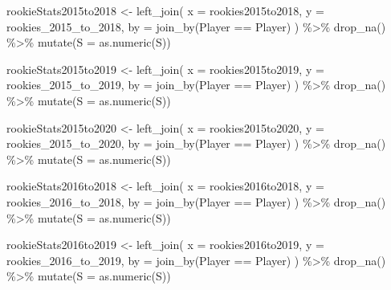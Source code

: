 \documentclass[
  letterpaper,
  DIV=11,
  numbers=noendperiod]{scrartcl}
\newenvironment{Shaded}{\begin{snugshade}}{\end{snugshade}}
\newcommand{\AttributeTok}[1]{\textcolor[rgb]{0.40,0.45,0.13}{#1}}
\newcommand{\FunctionTok}[1]{\textcolor[rgb]{0.28,0.35,0.67}{#1}}
\newcommand{\NormalTok}[1]{\textcolor[rgb]{0.00,0.23,0.31}{#1}}
\newcommand{\OtherTok}[1]{\textcolor[rgb]{0.00,0.23,0.31}{#1}}
\newcommand{\SpecialCharTok}[1]{\textcolor[rgb]{0.37,0.37,0.37}{#1}}
\begin{document}
\begin{Shaded}
\begin{Highlighting}[]
\NormalTok{rookieStats2015to2018 }\OtherTok{\textless{}{-}} \FunctionTok{left\_join}\NormalTok{(}
  \AttributeTok{x =}\NormalTok{ rookies2015to2018,}
  \AttributeTok{y =}\NormalTok{ rookies\_2015\_to\_2018,}
  \AttributeTok{by =} \FunctionTok{join\_by}\NormalTok{(Player }\SpecialCharTok{==}\NormalTok{ Player)}
\NormalTok{) }\SpecialCharTok{\%\textgreater{}\%}
  \FunctionTok{drop\_na}\NormalTok{() }\SpecialCharTok{\%\textgreater{}\%}
  \FunctionTok{mutate}\NormalTok{(}\AttributeTok{S =} \FunctionTok{as.numeric}\NormalTok{(S))}

\NormalTok{rookieStats2015to2019 }\OtherTok{\textless{}{-}} \FunctionTok{left\_join}\NormalTok{(}
  \AttributeTok{x =}\NormalTok{ rookies2015to2019,}
  \AttributeTok{y =}\NormalTok{ rookies\_2015\_to\_2019,}
  \AttributeTok{by =} \FunctionTok{join\_by}\NormalTok{(Player }\SpecialCharTok{==}\NormalTok{ Player)}
\NormalTok{) }\SpecialCharTok{\%\textgreater{}\%}
  \FunctionTok{drop\_na}\NormalTok{() }\SpecialCharTok{\%\textgreater{}\%}
  \FunctionTok{mutate}\NormalTok{(}\AttributeTok{S =} \FunctionTok{as.numeric}\NormalTok{(S))}

\NormalTok{rookieStats2015to2020 }\OtherTok{\textless{}{-}} \FunctionTok{left\_join}\NormalTok{(}
  \AttributeTok{x =}\NormalTok{ rookies2015to2020,}
  \AttributeTok{y =}\NormalTok{ rookies\_2015\_to\_2020,}
  \AttributeTok{by =} \FunctionTok{join\_by}\NormalTok{(Player }\SpecialCharTok{==}\NormalTok{ Player)}
\NormalTok{) }\SpecialCharTok{\%\textgreater{}\%}
  \FunctionTok{drop\_na}\NormalTok{() }\SpecialCharTok{\%\textgreater{}\%}
  \FunctionTok{mutate}\NormalTok{(}\AttributeTok{S =} \FunctionTok{as.numeric}\NormalTok{(S))}

\NormalTok{rookieStats2016to2018 }\OtherTok{\textless{}{-}} \FunctionTok{left\_join}\NormalTok{(}
  \AttributeTok{x =}\NormalTok{ rookies2016to2018,}
  \AttributeTok{y =}\NormalTok{ rookies\_2016\_to\_2018,}
  \AttributeTok{by =} \FunctionTok{join\_by}\NormalTok{(Player }\SpecialCharTok{==}\NormalTok{ Player)}
\NormalTok{) }\SpecialCharTok{\%\textgreater{}\%}
  \FunctionTok{drop\_na}\NormalTok{() }\SpecialCharTok{\%\textgreater{}\%}
  \FunctionTok{mutate}\NormalTok{(}\AttributeTok{S =} \FunctionTok{as.numeric}\NormalTok{(S))}

\NormalTok{rookieStats2016to2019 }\OtherTok{\textless{}{-}} \FunctionTok{left\_join}\NormalTok{(}
  \AttributeTok{x =}\NormalTok{ rookies2016to2019,}
  \AttributeTok{y =}\NormalTok{ rookies\_2016\_to\_2019,}
  \AttributeTok{by =} \FunctionTok{join\_by}\NormalTok{(Player }\SpecialCharTok{==}\NormalTok{ Player)}
\NormalTok{) }\SpecialCharTok{\%\textgreater{}\%}
  \FunctionTok{drop\_na}\NormalTok{() }\SpecialCharTok{\%\textgreater{}\%}
  \FunctionTok{mutate}\NormalTok{(}\AttributeTok{S =} \FunctionTok{as.numeric}\NormalTok{(S))}


\end{Highlighting}
\end{Shaded}
\end{document}
